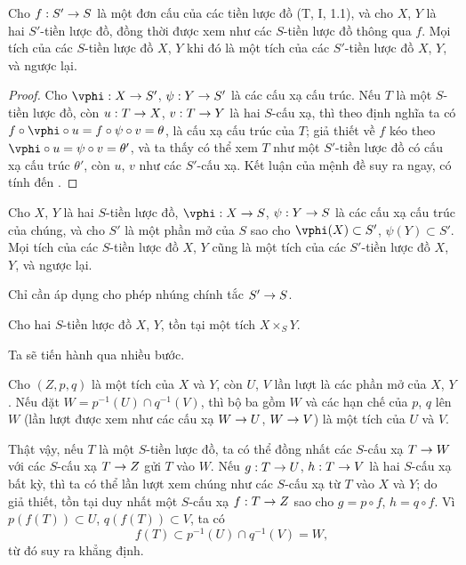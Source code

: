 \documentclass[oneside]{amsart}
\makeatletter
\newcommand{\ega@arrow}[2]{\mathchoice{#1}{#2}{#2}{#2}}
\renewcommand{\to}{\ega@arrow{\longrightarrow}{\rightarrow}}
\newcommand{\oldpage}[2][]{{\marginnote{\normalfont\textbf{#1}~|~#2}}\ignorespaces}
\let\EGAOriginalLabel\label
\renewcommand{\label}[1]{\phantomsection\EGAOriginalLabel{#1}}
\makeatother
\begin{document}
\begin{proposition}[3.2.4]
\label{I.3.2.4}
Cho $f:S'\to S$ là một đơn cấu của các tiền lược đồ (T, I, 1.1), và cho
$X$, $Y$ là hai $S'$-tiền lược đồ, đồng thời được xem như các $S$-tiền lược
đồ thông qua $f$. Mọi tích của các $S$-tiền lược đồ $X$, $Y$ khi đó là một
tích của các $S'$-tiền lược đồ $X$, $Y$, và ngược lại.
\end{proposition}

\begin{proof}
Cho $\vphi:X\to S'$, $\psi:Y\to S'$ là các cấu xạ cấu trúc. Nếu $T$ là một
$S$-tiền lược đồ, còn $u:T\to X$, $v:T\to Y$ là hai $S$-cấu xạ, thì theo
định nghĩa ta có $f\circ\vphi\circ u=f\circ\psi\circ v=\theta$, là cấu xạ
cấu trúc của $T$; giả thiết về $f$ kéo theo
$\vphi\circ u=\psi\circ v=\theta'$, và ta thấy có thể xem $T$ như một
$S'$-tiền lược đồ có cấu xạ cấu trúc $\theta'$, còn $u$, $v$ như các
$S'$-cấu xạ. Kết luận của mệnh đề suy ra ngay, có tính đến
.
\end{proof}

\begin{corollary}[3.2.5]
\label{I.3.2.5}
Cho $X$, $Y$ là hai $S$-tiền lược đồ, $\vphi:X\to S$, $\psi:Y\to S$ là các
cấu xạ cấu trúc của chúng, và cho $S'$ là một phần mở của $S$ sao cho
$\vphi(X)\subset S'$, $\psi(Y)\subset S'$. Mọi tích của các $S$-tiền lược đồ
$X$, $Y$ cũng là một tích của các $S'$-tiền lược đồ $X$, $Y$, và ngược lại.
\end{corollary}

\oldpage[I]{106}
Chỉ cần áp dụng  cho phép nhúng chính tắc $S'\to S$.

\begin{theorem}[3.2.6]
\label{I.3.2.6}
Cho hai $S$-tiền lược đồ $X$, $Y$, tồn tại một tích $X\times_S Y$.
\end{theorem}

Ta sẽ tiến hành qua nhiều bước.

\begin{lemma}[3.2.6.1]
\label{I.3.2.6.1}
Cho $(Z,p,q)$ là một tích của $X$ và $Y$, còn $U$, $V$ lần lượt là các phần
mở của $X$, $Y$. Nếu đặt $W=p^{-1}(U)\cap q^{-1}(V)$, thì bộ ba gồm $W$ và
các hạn chế của $p$, $q$ lên $W$ \textup{(lần lượt được xem như các cấu xạ
$W\to U$, $W\to V$)} là một tích của $U$ và $V$.
\end{lemma}

Thật vậy, nếu $T$ là một $S$-tiền lược đồ, ta có thể đồng nhất các
$S$-cấu xạ $T\to W$ với các $S$-cấu xạ $T\to Z$ gửi $T$ vào $W$. Nếu
$g:T\to U$, $h:T\to V$ là hai $S$-cấu xạ bất kỳ, thì ta có thể lần lượt xem
chúng như các $S$-cấu xạ từ $T$ vào $X$ và $Y$; do giả thiết, tồn tại duy
nhất một $S$-cấu xạ $f:T\to Z$ sao cho $g=p\circ f$, $h=q\circ f$. Vì
$p(f(T))\subset U$, $q(f(T))\subset V$, ta có
\[
  f(T)\subset p^{-1}(U)\cap q^{-1}(V)=W,
\]
từ đó suy ra khẳng định.
\end{document}
